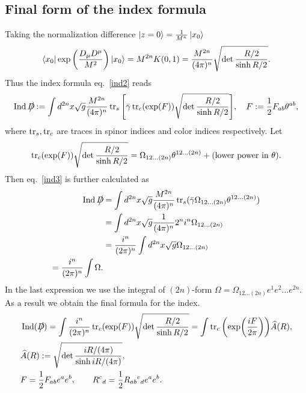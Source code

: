 \documentclass[12pt,a4paper]{article}
\DeclareMathOperator*{\Ind}{\mathrm{Ind}}
\newcommand{\gammab}{\bar{\gamma}}
\newcommand{\Dsla}{D\hspace{-0.65em}\big/}
\begin{document}
\subsection{Final form of the index formula}
Taking the normalization difference $\ket{z=0}=\frac{1}{M^n}\ket{x_0}$
\begin{align*}
  \bra{x_0}\exp\left(\frac{D_{\mu}D^{\mu}}{M^2}\right)\ket{x_0}=
  M^{2n} K(0,1)=\frac{M^{2n}}{(4\pi)^n}
  \sqrt{\det\frac{R/2}{\sinh R/2}}.
\end{align*}
Thus the index formula eq.~\eqref{ind2} reads
\begin{align}
  \Ind{\Dsla}:=\int d^{2n}x \sqrt{g}\frac{M^{2n}}{(4\pi)^n}\tr_{s}\qty[\gammab
    \tr_{c}(\exp(F))\sqrt{\det\frac{R/2}{\sinh R/2}}],\quad
  F:=\frac12 F_{ab}\theta^{ab},
  \label{ind3}
\end{align}
where $\tr_s,\tr_c$ are traces in spinor indices and color indices respectively.  Let
\begin{align}
  \tr_{c}(\exp(F))\sqrt{\det\frac{R/2}{\sinh R/2}}
  =\Omega_{12\dots(2n)}\theta^{12\dots(2n)}+(\text{lower power in }\theta).
\end{align}
Then eq.~\eqref{ind3} is further calculated as
\begin{align}
  \Ind{\Dsla}
   & =\int d^{2n}x \sqrt{g}\frac{M^{2n}}{(4\pi)^n}\tr_{s}(\gammab \Omega_{12\dots(2n)}\theta^{12\dots(2n)}) \\
   & =\int d^{2n}x \sqrt{g}\frac{1}{(4\pi)^n}2^n i^n\Omega_{12\dots(2n)}                                    \\
   & =\frac{i^n}{(2\pi)^n}\int d^{2n}x \sqrt{g}\Omega_{12\dots(2n)}                                         \\
  =\frac{i^n}{(2\pi)^n} \int \Omega.
\end{align}
In the last expression we use the integral of $(2n)$-form $\Omega=\Omega_{12\dots(2n)}e^1e^2\dots e^{2n}$.  As a result we obtain the final formula for the index.
\begin{align}
   & \Ind(\Dsla)
  =\int \frac{i^n}{(2\pi)^n}\tr_{c}(\exp(F))\sqrt{\det\frac{R/2}{\sinh R/2}}
  =\int \tr_{c}\qty(\exp(\frac{iF}{2\pi}))\widehat{A}(R),                          \\
   & \widehat{A}(R):=\sqrt{\det\frac{iR/(4\pi)}{\sinh iR/(4\pi)}},                 \\
   & F=\frac12 F_{ab}e^a e^b,\qquad R^{c}{}_{d}=\frac12 R_{ab}{}^{c}{}_{d}e^a e^b.
\end{align}
 
\end{document}
